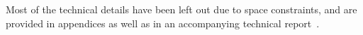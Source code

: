 Most of the technical details have been left out due to space
constraints, and are provided in appendices as well as in an
accompanying technical report~\cite{colosl-tr14}.

%
%
%
%
%
%
%
%
%
%


